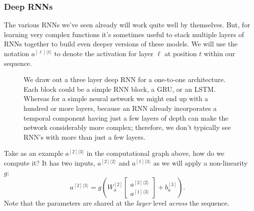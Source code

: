 \documentclass[12pt]{article}
\begin{document}
\subsubsection{Deep RNNs} The various RNNs we've seen already will work quite well by themselves. But, for learning very complex functions it's sometimes useful to stack multiple layers of RNNs together to build even deeper versions of these models. We will use the notation $a^{[\ell]\langle t \rangle }$ to denote the activation for layer $\ell$ at position $t$ within our sequence.
\begin{figure}[h]
  \centering
\caption{\footnotesize We draw out a three layer deep RNN for a one-to-one architecture. Each block could be a simple RNN block, a GRU, or an LSTM. Whereas for a simple neural network we might end up with a hundred or more layers, because an RNN already incorporates a temporal component having just a few layers of depth can make the network considerably more complex; therefore, we don't typically see RNN's with more than just a few layers.}
\end{figure}
Take as an example $a^{[2]\langle 3 \rangle}$ in the computational graph above, how do we compute it? It has two inputs, $a^{[2]\langle 2 \rangle}$ and $a^{[1]\langle 3 \rangle}$ as we will apply a non-linearity $g$:
\[
  a^{[2]\langle 3 \rangle } = g\left(W_a^{[2]} \begin{bmatrix} a^{[2]\langle 2 \rangle} \\ a^{[1]\langle 3 \rangle}             \end{bmatrix} + b_a^{[3]} \right).
\]
Note that the parameters are shared at the \emph{layer} level \emph{across} the sequence.
\end{document}
